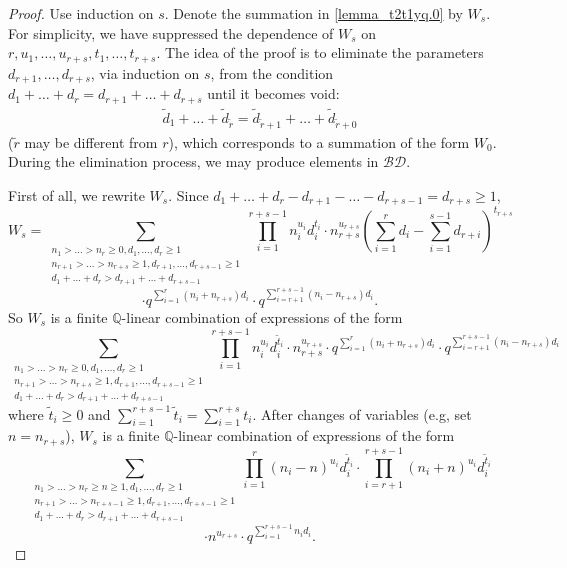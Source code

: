 \documentclass[12pt, reqno]{amsart}
\theoremstyle{definition}
\theoremstyle{remark}
\numberwithin{equation}{section}
\newcommand{\BD}{\mathcal {BD}}
\newcommand{\Q}{ \mathbb Q }
\newcommand{\w}{\tilde}
\numberwithin{equation}{section}
\begin{document}
\begin{proof}
Use induction on $s$. 
Denote the summation in \eqref{lemma_t2t1yq.0} by $W_s$. 
For simplicity, we have suppressed the dependence of $W_s$ on 
$r, u_1, \ldots, u_{r+s}, t_1, \ldots, t_{r+s}$. 
The idea of the proof is to eliminate the parameters 
$d_{r+1}, \ldots, d_{r+s}$, via induction on $s$, from the condition 
$d_1+ \ldots + d_r = d_{r+1} + \ldots + d_{r+s}$ until it becomes void:
\begin{eqnarray}  \label{lemma_t2t1yq.100}
\w d_1+ \ldots + \w d_{\w r} = \w d_{\w r+1} + \ldots + \w d_{\w r+0}
\end{eqnarray}
($\w r$ may be different from $r$), 
which corresponds to a summation of the form $W_0$. 
During the elimination process, we may produce elements in $\BD$.

First of all, we rewrite $W_s$. Since $d_1+ \ldots + d_r 
- d_{r+1} - \ldots - d_{r+s-1} = d_{r+s} \ge 1$, 
$$
W_s = \sum_{\substack{n_1 > \ldots > n_r \ge 0, d_1, \ldots, d_r \ge 1\\
    n_{r+1} > \ldots > n_{r+s} \ge 1, d_{r+1}, \ldots, d_{r+s-1} \ge 1\\
    d_1+ \ldots + d_r > d_{r+1} + \ldots + d_{r+s-1}}}
  \prod_{i=1}^{r+s-1} n_i^{u_i}d_i^{t_i} \cdot n_{r+s}^{u_{r+s}}
  \left (\sum_{i=1}^r d_i - \sum_{i=1}^{s-1} d_{r+i} \right )^{t_{r+s}} 
$$
$$
\cdot q^{\sum_{i=1}^{r} (n_i + n_{r+s})d_i}
\cdot q^{\sum_{i=r+1}^{r+s-1} (n_i - n_{r+s})d_i}.
$$
So $W_s$ is a finite $\Q$-linear combination of expressions of the form
$$
\sum_{\substack{n_1 > \ldots > n_r \ge 0, d_1, \ldots, d_r \ge 1\\
  n_{r+1} > \ldots > n_{r+s} \ge 1, d_{r+1}, \ldots, d_{r+s-1} \ge 1\\
  d_1+ \ldots + d_r > d_{r+1} + \ldots + d_{r+s-1}}}
  \prod_{i=1}^{r+s-1} n_i^{u_i}d_i^{\w t_i} \cdot n_{r+s}^{u_{r+s}} 
  \cdot q^{\sum_{i=1}^{r} (n_i + n_{r+s})d_i}
  \cdot q^{\sum_{i=r+1}^{r+s-1} (n_i - n_{r+s})d_i}
$$
where $\w t_i \ge 0$ and $\sum_{i=1}^{r+s-1} \w t_i 
= \sum_{i=1}^{r+s} t_i$. 
After changes of variables (e.g, set $n = n_{r+s}$), 
$W_s$ is a finite $\Q$-linear combination of expressions of the form 
$$
\sum_{\substack{n_1 > \ldots > n_r \ge n \ge 1, d_1, \ldots, d_r \ge 1\\
    n_{r+1} > \ldots > n_{r+s-1} \ge 1, d_{r+1}, \ldots, d_{r+s-1} \ge 1\\
    d_1+ \ldots + d_r > d_{r+1} + \ldots + d_{r+s-1}}}
   \prod_{i=1}^{r} (n_i-n)^{u_i}d_i^{\w t_i} \cdot 
   \prod_{i=r+1}^{r+s-1} (n_i+n)^{u_i}d_i^{\w t_i} 
$$
$$
\cdot n^{u_{r+s}} \cdot q^{\sum_{i=1}^{r+s-1} n_i d_i}.
$$
\end{proof}
\end{document}
